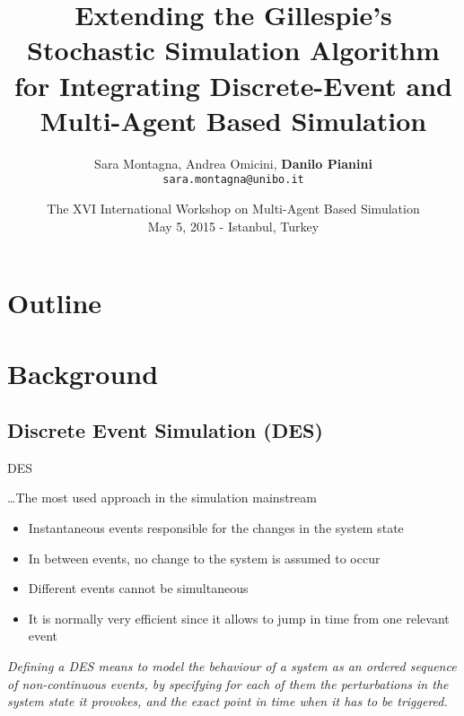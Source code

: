 \documentclass[presentation]{beamer} %
\title[Gillespie's SSA to Integrate DES and MABS]{Extending the Gillespie's Stochastic Simulation Algorithm for Integrating Discrete-Event and Multi-Agent Based Simulation}
\author[Montagna, Omicini, Pianini]{
Sara Montagna, Andrea Omicini, \textbf{Danilo Pianini}
\\
\texttt{{\footnotesize sara.montagna@unibo.it}}}
\institute[UNIBO]
{\textsc{Alma Mater Studiorum}---Universit\`a di Bologna a Cesena}
\date[2015-05-15 MABS]{The XVI International Workshop on Multi-Agent Based Simulation\\
\scriptsize May 5, 2015 - Istanbul, Turkey
}
\begin{document}
\frame[label=coverpage]{\titlepage}

\section*{Outline}
\frame{\tableofcontents}



\section{Background}

\subsection{Discrete Event Simulation (DES)}


\begin{frame}{DES}

\ldots The most used approach in the simulation mainstream
\begin{block}{}
	\begin{itemize}
    		\item Instantaneous events responsible for the changes in the system state
    		\item In between events, no change to the system is assumed to occur
    		\item Different events cannot be simultaneous
		\item It is normally very efficient since it allows to jump in time from one relevant event
	\end{itemize}
\end{block}

		
\emph{Defining a DES means to model the behaviour of a system as an ordered sequence of non-continuous events, by specifying for each of them the \emph{perturbations} in the system state it provokes, and the exact point in time when it has to be triggered. }

\end{frame}
\end{document}
